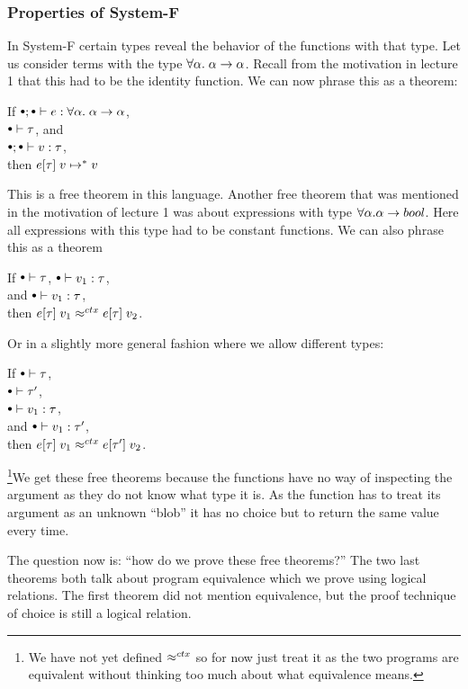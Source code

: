 \subsubsection*{Properties of System-F}
In System-F certain types reveal the behavior of the functions with that type. Let us consider terms with the type $\forall \alpha.\;  \alpha \rightarrow \alpha$. Recall from the motivation in lecture 1 that this had to be the identity function. We can now phrase this as a theorem:
\begin{theorem}
  If $\mtenv ; \mtenv \vdash e : \forall \alpha. \; \tarrow{\alpha}{\alpha}$,\\ $\mtenv \vdash \tau$, and\\ $\mtenv; \mtenv \vdash v : \tau$,\\ then $e[\tau]\; v \mapsto^{*} v$
\end{theorem}
This is a free theorem in this language. Another free theorem that was mentioned in the motivation of lecture 1 was about expressions with type $\forall \alpha.  \alpha \rightarrow bool$. Here all expressions with this type had to be constant functions. We can also phrase this as a theorem
\begin{theorem}
  If $\mtenv \vdash \tau$, $\mtenv \vdash v_1 : \tau$,\\ and $\mtenv \vdash v_1 : \tau$,\\ then $e[\tau] \; v_1 \approx^{ctx} e[\tau]\; v_2$.
\end{theorem}
Or in a slightly more general fashion where we allow different types:
\begin{theorem}
  If $\mtenv \vdash \tau$, \\ $\mtenv \vdash \tau'$, \\$\mtenv \vdash v_1 : \tau$,\\ and $\mtenv \vdash v_1 : \tau'$,\\ then $e[\tau]\; v_1 \approx^{ctx} e[\tau']\; v_2$.
\end{theorem}
\footnote{We have not yet defined $ \approx^{ctx} $ so for now just treat it as the two programs are equivalent without thinking too much about what equivalence means.}We get these free theorems because the functions have no way of inspecting the argument as they do not know what type it is. As the function has to treat its argument as an unknown ``blob'' it has no choice but to return the same value every time.

The question now is: ``how do we prove these free theorems?'' The two last theorems both talk about program equivalence which we prove using logical relations. The first theorem did not mention equivalence, but the proof technique of choice is still a logical relation.

